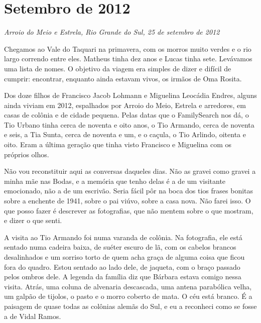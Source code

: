 \documentclass[
  brazilian,
  11pt,
  openany]{book}
\begin{document}
\section{Setembro de 2012}\label{setembro-de-2012}

\emph{Arroio do Meio e Estrela, Rio Grande do Sul, 25 de setembro de
2012}

Chegamos ao Vale do Taquari na primavera, com os morros muito verdes e o
rio largo correndo entre eles. Matheus tinha dez anos e Lucas tinha
sete. Levávamos uma lista de nomes. O objetivo da viagem era simples de
dizer e difícil de cumprir: encontrar, enquanto ainda estavam vivos, os
irmãos de Oma Rosita.

Dos doze filhos de Francisco Jacob Lohmann e Miguelina Leocádia Endres,
alguns ainda viviam em 2012, espalhados por Arroio do Meio, Estrela e
arredores, em casas de colônia e de cidade pequena. Pelas datas que o
FamilySearch nos dá, o Tio Urbano tinha cerca de noventa e oito anos, o
Tio Armando, cerca de noventa e seis, a Tia Sunta, cerca de noventa e
um, e o caçula, o Tio Arlindo, oitenta e oito. Eram a última geração que
tinha visto Francisco e Miguelina com os próprios olhos.

Não vou reconstituir aqui as conversas daqueles dias. Não as gravei como
gravei a minha mãe nas Bodas, e a memória que tenho delas é a de um
visitante emocionado, não a de um escrivão. Seria fácil pôr na boca dos
tios frases bonitas sobre a enchente de 1941, sobre o pai viúvo, sobre a
casa nova. Não farei isso. O que posso fazer é descrever as fotografias,
que não mentem sobre o que mostram, e dizer o que senti.

A visita ao Tio Armando foi numa varanda de colônia. Na fotografia, ele
está sentado numa cadeira baixa, de suéter escuro de lã, com os cabelos
brancos desalinhados e um sorriso torto de quem acha graça de alguma
coisa que ficou fora do quadro. Estou sentado ao lado dele, de jaqueta,
com o braço passado pelos ombros dele. A legenda da família diz que
Bárbara estava comigo nessa visita. Atrás, uma coluna de alvenaria
descascada, uma antena parabólica velha, um galpão de tijolos, o pasto e
o morro coberto de mata. O céu está branco. É a paisagem de quase todas
as colônias alemãs do Sul, e eu a reconheci como se fosse a de Vidal
Ramos.
\end{document}
